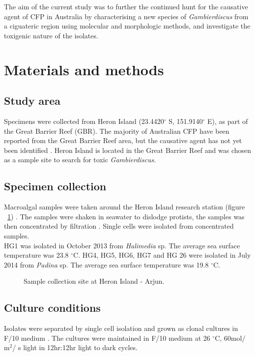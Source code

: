 \documentclass[12pt]{article}
\begin{document}
\FloatBarrier 
The aim of the current study was to further the continued hunt for the causative agent of CFP in Australia by characterising a new species of \emph{Gambierdiscus} from a ciguateric region using molecular and morphologic methods, and investigate the toxigenic nature of the isolates.

  \newpage
\section{Materials and methods}

\subsection{Study area}
Specimens were collected from Heron Island (23.4420$^{\circ}$ S, 151.9140$^{\circ}$ E), as part of the Great Barrier Reef (GBR). The majority of Australian CFP have been reported from the Great Barrier Reef area, but the causative agent has not yet been identified \cite{lewis2006ciguatera}. Heron Island is located in the Great Barrier Reef and was chosen as a sample site to search for toxic \emph{Gambierdiscus}.\\

\subsection{Specimen collection}
 
Macroalgal samples were taken around the Heron Island research station (figure ~\ref{fig:HeronMap})  . The samples were shaken in seawater to dislodge protists, the samples was then concentrated by filtration \cite{litaker2010global}. Single cells were isolated from concentrated samples.\\
HG1 was isolated in October 2013 from \emph{Halimedia} sp. The average sea surface temperature was 23.8 $^{\circ}$C. 
HG4, HG5, HG6, HG7 and HG 26 were isolated in July 2014 from \emph{Padina} sp. The average sea surface temperature was 19.8 $^{\circ}$C.

\FloatBarrier 
\begin{figure} 
\caption{Sample collection site at Heron Island - Arjun.} 
\label{fig:HeronMap}
\end{figure} 
\FloatBarrier 

\subsection{Culture conditions}
Isolates were separated by single cell isolation and grown as clonal cultures in F/10 medium \cite{holmes1991strain}. The cultures were maintained in F/10 medium at 26 $^{\circ}$C, 60mol/ m$^{2}$/ s light in 12hr:12hr light to dark cycles.
\end{document}
